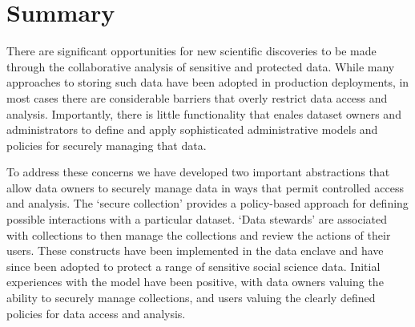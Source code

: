 \section{Summary}


There are significant opportunities for new scientific discoveries to be made
through the collaborative analysis of sensitive and protected
data. While many approaches to storing such data
have been adopted in production deployments, in most cases there are
considerable barriers that overly restrict data access and analysis. 
Importantly, there is little functionality that enales dataset owners and administrators
to define and apply sophisticated administrative models and policies 
for securely managing that data. 

To address these concerns we have developed two important abstractions
that allow data owners to securely manage data in ways that permit
controlled access and analysis. The `secure collection' provides a 
policy-based approach for defining possible interactions with a particular
dataset. `Data stewards' are associated with collections to then
manage the collections and review the actions of their users. These
constructs have been implemented in the \NAME data enclave
and have since been adopted to protect a range of sensitive
social science data. Initial experiences with the model
have been positive, with data owners valuing the ability 
to securely manage collections, and users valuing the clearly
defined policies for data access and analysis. 
